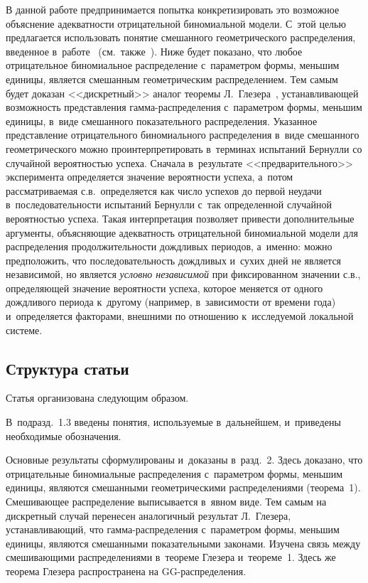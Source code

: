 \begin{multicols}{2}
В данной работе предпринимается попытка конкретизировать это
возможное объяснение адек\-ват\-ности отрицательной биномиальной модели.
С~этой целью предлагается использовать понятие смешанного
геометрического распределения, введенное в~работе~\cite{Korolev2016TVP} 
(см.\ также~\cite{KorolevPoisson, Korolev2016}). Ниже будет показано, что 
любое отрицательное
биномиальное распределение с~параметром формы, меньшим единицы,
является смешанным гео\-мет\-ри\-че\-ским распределением. Тем самым будет
доказан <<дискретный>> аналог теоремы Л.~Глезера~\cite{Gleser1989},
устанавливающей возможность пред\-став\-ле\-ния гам\-ма-рас\-пре\-де\-ле\-ния 
с~параметром формы, меньшим\linebreak
 единицы, в~виде смешанного показательного
распределения. Указанное представление отрицательного биномиального
распределения в~виде смешанного гео\-мет\-ри\-че\-ско\-го можно
проинтерпретировать в~терминах испытаний Бернулли со случайной
вероятностью успеха. Сначала в~результате <<предварительного>>
эксперимента определяется значение вероятности успеха, а~потом
рассматриваемая с.в.\ определяется как число успехов до
первой неудачи в~последовательности испытаний Бернулли с~так
определенной случайной ве\-ро\-ят\-ностью успеха. Такая интерпретация
позволяет привести дополнительные аргументы, объясняющие
адекватность отрицательной биномиальной модели для распределения
продолжительности дождливых периодов, а~именно: можно предположить,
что последовательность дождливых и~сухих дней не является
независимой, но является {\it условно независимой} при фиксированном
значении с.в., определяющей значение
ве\-ро\-ят\-ности успеха, которое меняется от одного дождливого периода 
к~другому (например, в~зависимости от времени года) и~определяется
факторами, внешними по отношению к~исследуемой локальной системе.

\subsection{Структура статьи}

Статья организована следующим образом. 

В~подразд.~1.3 введены
понятия, используемые в~дальнейшем, и~приведены необходимые
обозначения. 

Основные результаты сформулированы и~доказаны в~разд.~2. 
Здесь доказано, что отрицательные биномиальные распределения с~параметром формы, 
меньшим единицы, являются смешанными
геометрическими распределениями (теорема~1). Смешивающее
распределение выписывается в~явном виде. Тем самым на дискретный
случай перенесен аналогичный результат Л.~Глезера, устанавливающий,
что гам\-ма-рас\-пре\-де\-ле\-ния с~параметром формы, меньшим единицы,
являются смешанными показательными законами. Изучена связь между
смешивающими распределениями в~теореме Глезера и~теореме~1. Здесь же
теорема Глезера распространена на GG-рас\-пре\-де\-ле\-ния. 


\end{multicols}
